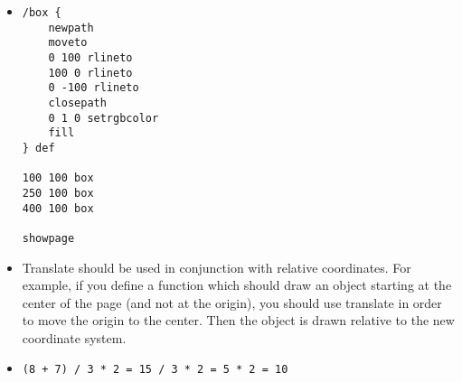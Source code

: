 \begin{itemize}
    \item 
    \begin{verbatim}
/box {			
	newpath
	moveto		
	0 100 rlineto
	100 0 rlineto
	0 -100 rlineto
	closepath
	0 1 0 setrgbcolor
	fill
} def

100 100 box
250 100 box
400 100 box

showpage
\end{verbatim}

    \item Translate should be used in conjunction with relative coordinates.
For example, if you define a function which should draw an object starting at
the center of the page (and not at the origin), you should use translate in
order to move the origin to the center. Then the object is drawn relative to
the new coordinate system.

    \item \texttt{(8 + 7) / 3 * 2 = 15 / 3 * 2 = 5 * 2 = 10}
\end{itemize}